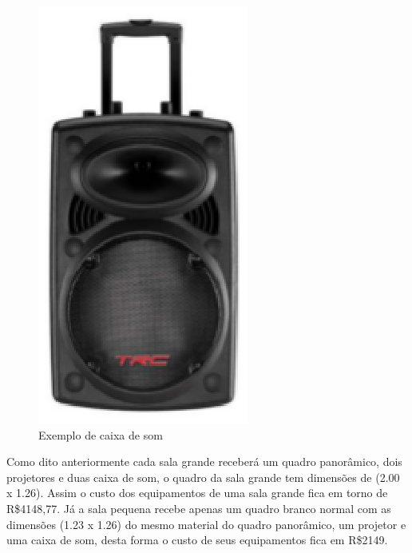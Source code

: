 \begin{figure}[!ht]
\centering
\includegraphics[scale=1]{figuras/caixa_de_som.eps}
\caption{Exemplo de caixa de som}
\end{figure}

Como dito anteriormente cada sala grande receberá um quadro panorâmico, dois projetores e duas caixa de som, o quadro da sala grande tem dimensões de (2.00 x 1.26). Assim o custo dos equipamentos de uma sala grande fica em torno de R\$4148,77. Já a sala pequena recebe apenas um quadro branco normal com as dimensões (1.23 x 1.26) do mesmo material do quadro panorâmico, um projetor e uma caixa de som, desta forma o custo de seus equipamentos fica em R\$2149.

